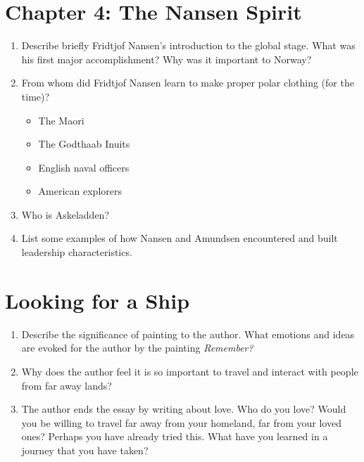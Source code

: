 \documentclass{article}
\begin{document}
\section{Chapter 4: The Nansen Spirit}
\begin{enumerate}
\item Describe briefly Fridtjof Nansen's introduction to the global stage.  What was his first major accomplishment?  Why was it important to Norway? \\ \vspace{3cm}
\item From whom did Fridtjof Nansen learn to make proper polar clothing (for the time)?
\begin{itemize}
\item The Maori
\item The Godthaab Inuits
\item English naval officers
\item American explorers
\end{itemize}
\item Who is Askeladden? \\ \vspace{2cm}
\item List some examples of how Nansen and Amundsen encountered and built leadership characteristics. \\ \vspace{4cm}
\end{enumerate}

\section{Looking for a Ship}
\begin{enumerate}
\item Describe the significance of painting to the author.  What emotions and ideas are evoked for the author by the painting \textit{Remember?} \\ \vspace{4cm}
\item Why does the author feel it is so important to travel and interact with people from far away lands? \\ \vspace{4cm}
\item The author ends the essay by writing about love.  Who do you love?  Would you be willing to travel far away from your homeland, far from your loved ones?  Perhaps you have already tried this.  What have you learned in a journey that you have taken?
\end{enumerate}
\end{document}

